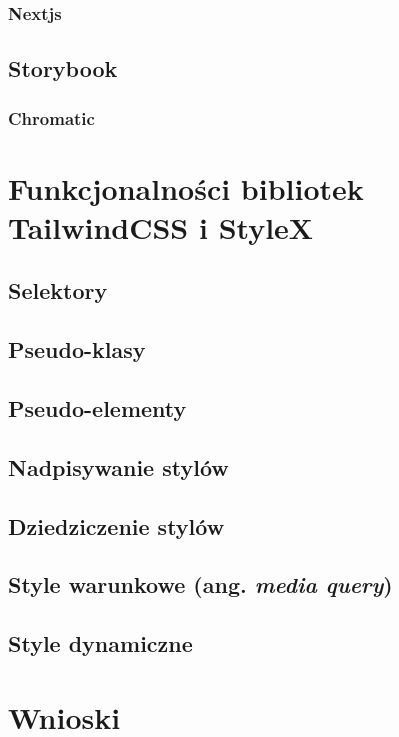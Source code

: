 \documentclass[a4paper,12pt]{book} %
\begin{document}
\subsection{Nextjs}
\section{Storybook}
\subsection{Chromatic}

\chapter{Funkcjonalności bibliotek TailwindCSS i StyleX}
\section{Selektory}
\section{Pseudo-klasy}
\section{Pseudo-elementy}
\section{Nadpisywanie stylów}
\section{Dziedziczenie stylów}
\section{Style warunkowe (ang. \emph{media query})}
\section{Style dynamiczne}

\chapter{Wnioski}
\end{document}
